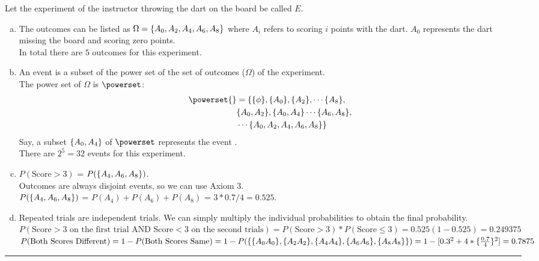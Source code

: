 Let the experiment of the instructor throwing the dart on the board be called $E$.
\begin{enumerate}[a.]
	\item The outcomes can be listed as $\Omega = \{A_0, A_2, A_4, A_6, A_8\}$ where $A_i$ refers to scoring $i$ points with the dart. $A_0$ represents the dart missing the board and scoring zero points. \\
	In total there are $5$ outcomes for this experiment.
	\item An event is a subset of the power set of the set of outcomes ($\Omega$) of the experiment.\\
	The power set of $\Omega$ is $\powerset$: 
	\begin{align}
		\powerset{} &= \{\set\phi, \set{A_0}, \set{ A_2}, \cdots  \set{A_8}, \nonumber\\
		& \set{A_0, A_2}, \set{A_0, A_4} \cdots \set{A_6, A_8}, \nonumber \\ 
		& \cdots \set{A_0, A_2, A_4, A_6, A_8}\} \nonumber 
	\end{align}
	Say, a subset $\{A_0, A_4\}$ of $\powerset$ represents the event .\\
	There are $2^5 = 32$ events for this experiment.
	\item $P(\text{Score} > 3)$ = $P(\{A_4, A_6, A_8\})$.\\ Outcomes are always disjoint events, so we can use Axiom 3. \\
	$P(\{A_4, A_6, A_8\})$ = $P(A_4) + P(A_6) + P(A_8)$ = $3*0.7/4 = 0.525$.
	\item Repeated trials are independent trials. We can simply multiply the individual probabilities to obtain the final probability. \\
	$P(\text{Score} > 3 \text{ on the first trial AND Score} < 3 \text{ on the second trials}) = P(\text{Score} > 3)*P(\text{Score} \leq 3) = 0.525(1-0.525) = 0.249375$\\[10pt]
	$P(\text{Both Scores Different}) = 1 - P(\text{Both Scores Same}) \\
	= 1 - P(\{\{A_0 A_0\}, \{A_2 A_2\}, \{A_4 A_4\}, \{A_6 A_6\}, \{A_8 A_8\}\}) \\
	= 1 - [0.3^2 + 4*\{\frac{0.7}{4}\}^2] = 0.7875$
\end{enumerate}

\noindent\rule{\textwidth}{1pt}